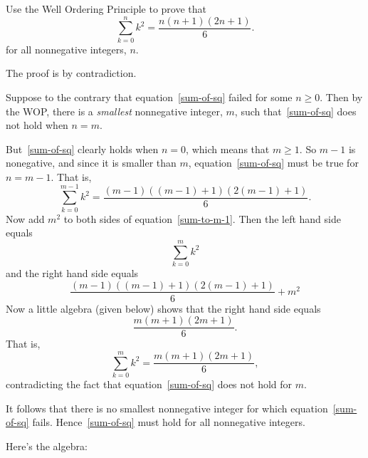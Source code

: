 \documentclass[handout]{mcs}
\begin{document}
\begin{problem}
Use the Well Ordering Principle to prove that
\begin{equation}\label{sum-of-sq}
\sum_{k=0}^n k^2 = \frac{n(n+1)(2n+1)}{6}.
\end{equation}
for all nonnegative integers, $n$.


\begin{solution}
The proof is by contradiction.

Suppose to the contrary that equation~\eqref{sum-of-sq} failed for some $n
\geq 0$.  Then by the WOP, there is a \emph{smallest} nonnegative integer,
$m$, such that~\eqref{sum-of-sq} does not hold when $n = m$.

But~\eqref{sum-of-sq} clearly holds when $n = 0$, which means that $m \geq
1$.  So $m-1$ is nonegative, and since it is smaller than $m$,
equation~\eqref{sum-of-sq} must be true for $n = m-1$.  That is,
\begin{equation}\label{sum-to-m-1}
\sum_{k=0}^{m-1} k^2 = \frac{(m-1)((m-1) + 1)(2(m-1)+1)}{6}.
\end{equation}
Now add $m^2$ to both sides of equation~\eqref{sum-to-m-1}.
Then the left hand side equals
\[
\sum_{k=0}^{m} k^2
\]
and the right hand side equals
\[
\frac{(m-1)((m-1) + 1)(2(m-1)+1)}{6} + m^2 
\]
Now a little algebra (given below) shows that the right hand side equals
\[
\frac{m(m+1)(2m+1)}{6}.
\]
That is,
\[
\sum_{k=0}^{m} k^2 = \frac{m(m+1)(2m+1)}{6},
\]
contradicting the fact that equation~\eqref{sum-of-sq} does not hold for
$m$.

It follows that there is no smallest nonnegative integer for which
equation~\eqref{sum-of-sq} fails.  Hence~\eqref{sum-of-sq} must hold for
all nonnegative integers.

Here's the algebra:

\end{solution}

\end{problem}
\end{document}
